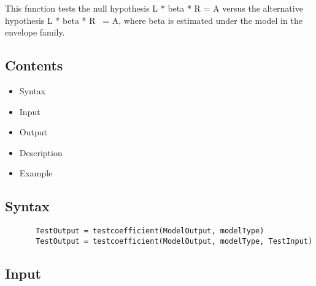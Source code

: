 \documentclass[a4paper,11pt,openany]{memoir}
\begin{document}
This function tests the null hypothesis L * beta * R = A versus the
alternative hypothesis L * beta * R ~= A, where beta is estimated under
the model in the envelope family.
    
\subsection*{Contents}

\begin{itemize}
\setlength{\itemsep}{-1ex}
   \item Syntax
   \item Input
   \item Output
   \item Description
   \item Example
\end{itemize}


\subsection*{Syntax}


\begin{verbatim}       TestOutput = testcoefficient(ModelOutput, modelType)
       TestOutput = testcoefficient(ModelOutput, modelType, TestInput)\end{verbatim}
    

\subsection*{Input}
\end{document}
